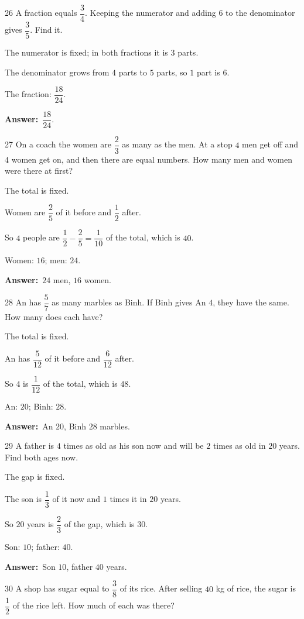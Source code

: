 \documentclass[11pt]{article}
\newif\ifsol \solfalse
\providecommand{\AnsWord}{Đáp số}
\newcommand{\dapso}[1]{\par\textbf{\AnsWord:}\ #1}
\newcommand{\probsol}[1]{%
  \begin{lrbox}{\solmeasure}\begin{minipage}{\dimexpr\linewidth-24pt\relax}#1\end{minipage}\end{lrbox}%
  \ifsol
    \begin{solbox}#1\end{solbox}%
  \else
    \setlength{\solht}{\dimexpr\ht\solmeasure+\dp\solmeasure+0.85cm\relax}%
    \ifdim\solht<1.35cm\setlength{\solht}{1.35cm}\fi
    \begin{tcolorbox}[colback=white,colframe=Line,boxrule=0.8pt,arc=5pt,
      left=8pt,right=8pt,top=4pt,bottom=4pt,height=\solht]{\footnotesize\color{Slate}\itshape\WorkWord}\end{tcolorbox}%
  \fi}
\newcommand{\gap}{\vspace{0.3cm}}
\def\WorkWord{Your work:}
\def\AnsWord{Answer}
\begin{document}
\gap
\begin{probbox}{26}{\relax}
A fraction equals $\dfrac34$. Keeping the numerator and adding $6$ to the denominator gives $\dfrac35$. Find it.
\end{probbox}
\probsol{
The numerator is fixed; in both fractions it is $3$ parts.\par The denominator grows from $4$ parts to $5$ parts, so $1$ part is $6$.\par The fraction: $\dfrac{18}{24}$.
\dapso{$\dfrac{18}{24}$.}}
\gap
\begin{probbox}{27}{\relax}
On a coach the women are $\dfrac23$ as many as the men. At a stop $4$ men get off and $4$ women get on, and then there are equal numbers. How many men and women were there at first?
\end{probbox}
\probsol{
The total is fixed.\par Women are $\dfrac25$ of it before and $\dfrac12$ after.\par So $4$ people are $\dfrac12-\dfrac25=\dfrac1{10}$ of the total, which is $40$.\par Women: $16$; men: $24$.
\dapso{$24$ men, $16$ women.}}
\gap
\begin{probbox}{28}{\relax}
An has $\dfrac57$ as many marbles as Binh. If Binh gives An $4$, they have the same. How many does each have?
\end{probbox}
\probsol{
The total is fixed.\par An has $\dfrac5{12}$ of it before and $\dfrac6{12}$ after.\par So $4$ is $\dfrac1{12}$ of the total, which is $48$.\par An: $20$; Binh: $28$.
\dapso{An $20$, Binh $28$ marbles.}}
\gap
\begin{probbox}{29}{\relax}
A father is $4$ times as old as his son now and will be $2$ times as old in $20$ years. Find both ages now.
\end{probbox}
\probsol{
The gap is fixed.\par The son is $\dfrac13$ of it now and $1$ times it in $20$ years.\par So $20$ years is $\dfrac23$ of the gap, which is $30$.\par Son: $10$; father: $40$.
\dapso{Son $10$, father $40$ years.}}
\gap
\begin{probbox}{30}{\relax}
A shop has sugar equal to $\dfrac38$ of its rice. After selling $40$ kg of rice, the sugar is $\dfrac12$ of the rice left. How much of each was there?
\end{probbox}
\end{document}
